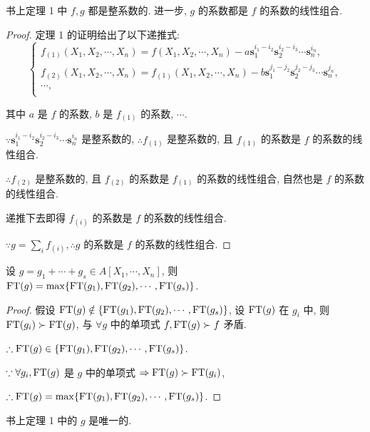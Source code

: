 \documentclass[UTF8]{ctexart}
\begin{document}
\begin{theorem}
    书上定理 1 中 $f,g$ 都是整系数的. 进一步, $g$ 的系数都是 $f$ 的系数的线性组合.
\end{theorem}
\begin{proof}
    定理 1 的证明给出了以下递推式:
    \[\begin{cases}
        f_{(1)}(X_1,X_2,\cdots,X_n)=f(X_1,X_2,\cdots,X_n)-a\mathbf{s}_1^{i_1-i_2}\mathbf{s}_2^{i_2-i_3}\cdots\mathbf{s}_n^{i_n}, \\
        f_{(2)}(X_1,X_2,\cdots,X_n)=f_{(1)}(X_1,X_2,\cdots,X_n)-b\mathbf{s}_1^{j_1-j_2}\mathbf{s}_2^{j_2-j_3}\cdots\mathbf{s}_n^{j_n}, \\
        \cdots, \\
    \end{cases}\]

    其中 $a$ 是 $f$ 的系数, $b$ 是 $f_{(1)}$ 的系数, $\cdots$.

    $\because\mathbf{s}_1^{i_1-i_2}\mathbf{s}_2^{i_2-i_3}\cdots\mathbf{s}_n^{i_n}$ 是整系数的, $\therefore f_{(1)}$ 是整系数的, 且 $f_{(1)}$ 的系数是 $f$ 的系数的线性组合.

    $\therefore f_{(2)}$ 是整系数的, 且 $f_{(2)}$ 的系数是 $f_{(1)}$ 的系数的线性组合, 自然也是 $f$ 的系数的线性组合.

    递推下去即得 $f_{(i)}$ 的系数是 $f$ 的系数的线性组合.

    $\because g=\sum\limits_{i}f_{(i)},\therefore g$ 的系数是 $f$ 的系数的线性组合.
\end{proof}
\begin{lemma}\label{l2.1}
    设 $g=g_1+\cdots+g_s\in A[X_1,\cdots,X_n]$, 则 $\operatorname{FT} (g)=\max\{\operatorname{FT} (g_1),\operatorname{FT} (g_2),\cdots,\operatorname{FT} (g_s)\}$.
\end{lemma}
\begin{proof}
    假设 $\operatorname{FT} (g)\notin\{\operatorname{FT} (g_1),\operatorname{FT} (g_2),\cdots,\operatorname{FT} (g_s)\}$, 设 $\operatorname{FT} (g)$ 在 $g_i$ 中, 则 $\operatorname{FT} (g_i)\succ\operatorname{FT} (g)$, 与 $\forall g$ 中的单项式 $f,\operatorname{FT} (g)\succ f$ 矛盾.

    $\therefore\operatorname{FT} (g)\in\{\operatorname{FT} (g_1),\operatorname{FT} (g_2),\cdots,\operatorname{FT} (g_s)\}$.

    $\because\forall g_i,\operatorname{FT} (g)$ 是 $g$ 中的单项式 $\Rightarrow\operatorname{FT} (g)\succ\operatorname{FT} (g_i)$,
    
    $\therefore\operatorname{FT} (g)=\max\{\operatorname{FT} (g_1),\operatorname{FT} (g_2),\cdots,\operatorname{FT} (g_s)\}$.
\end{proof}
\begin{theorem}
    书上定理 1 中的 $g$ 是唯一的.
\end{theorem}
\end{document}

